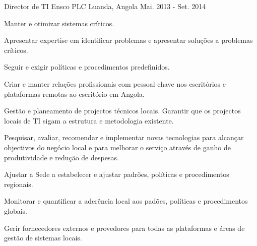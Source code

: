 \begin{cventries}
\cventry
{Director de TI} %
{Ensco PLC} %
{Luanda, Angola} %
{Mai. 2013 - Set. 2014} %
{ %
\begin{cvitems}
\item {Manter e otimizar sistemas críticos.}
\item {Apresentar expertise em identificar problemas e apresentar soluções a problemas críticos.}
\item {Seguir e exigir políticas e procedimentos predefinidos.}
\item {Criar e manter relações profissionais com pessoal chave nos escritórios e plataformas remotas ao escritório em Angola.}
\item {Gestão e planeamento de projectos técnicos locais. Garantir que os projectos locais de TI sigam a estrutura e metodologia existente.}
\item {Pesquisar, avaliar, recomendar e implementar novas tecnologias para alcançar objectivos do negócio local e para melhorar o serviço através de ganho de produtividade e redução de despesas.}
\item {Ajustar a Sede a estabelecer e ajustar padrões, políticas e procedimentos regionais.}
\item {Monitorar e quantificar a aderência local aos padões, políticas e procedimentos globais.}
\item {Gerir fornecedores externos e provedores para todas as plataformas e áreas de gestão de sistemas locais.}
\end{cvitems}
}



\end{cventries}
